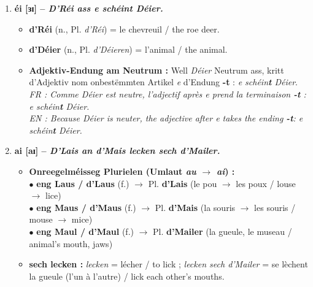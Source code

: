 \begin{enumerate}
    \item \textbf{éi {[ɜɪ]} -- \textit{D'Réi ass e schéint Déier.}}
    \begin{itemize}
        \item \textbf{d'Réi} (n., Pl. \textit{d'Réi}) = le chevreuil / the roe deer.
        \item \textbf{d'Déier} (n., Pl. \textit{d'Déieren}) = l'animal / the animal.
        \item \textbf{Adjektiv-Endung am Neutrum :} Well \textit{Déier} Neutrum ass, kritt d'Adjektiv nom onbestëmmten Artikel \textit{e} d'Endung \textbf{-t} : \textit{e schéin\textbf{t} Déier}. \\
        \textit{FR : Comme \textit{Déier} est neutre, l'adjectif après \textit{e} prend la terminaison \textbf{-t} : \textit{e schéin\textbf{t} Déier}.} \\
        \textit{EN : Because \textit{Déier} is neuter, the adjective after \textit{e} takes the ending \textbf{-t}: \textit{e schéin\textbf{t} Déier}.}
    \end{itemize}

    \vspace{0.3em}

    \item \textbf{ai {[aɪ]} -- \textit{D'Lais an d'Mais lecken sech d'Mailer.}}
    \begin{itemize}
        \item \textbf{Onreegelméisseg Plurielen (Umlaut \textit{au $\rightarrow$ ai}) :} \\
        $\bullet$ \textbf{eng Laus / d'Laus} (f.) $\rightarrow$ Pl. \textbf{d'Lais} (le pou $\rightarrow$ les poux / louse $\rightarrow$ lice) \\
        $\bullet$ \textbf{eng Maus / d'Maus} (f.) $\rightarrow$ Pl. \textbf{d'Mais} (la souris $\rightarrow$ les souris / mouse $\rightarrow$ mice) \\
        $\bullet$ \textbf{eng Maul / d'Maul} (f.) $\rightarrow$ Pl. \textbf{d'Mailer} (la gueule, le museau / animal's mouth, jaws)
        \item \textbf{sech lecken :} \textit{lecken} = lécher / to lick ; \textit{lecken sech d'Mailer} = se lèchent la gueule (l'un à l'autre) / lick each other's mouths.
    \end{itemize}

    \vspace{0.3em}


\end{enumerate}
